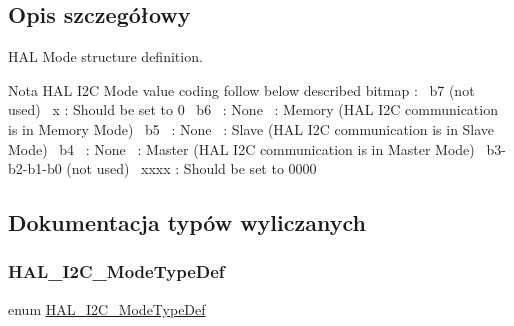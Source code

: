 \subsection{Opis szczegółowy}
H\+AL Mode structure definition. 

\begin{DoxyNote}{Nota}
H\+AL I2C Mode value coding follow below described bitmap \+:~\newline
 b7 (not used)~\newline
 x \+: Should be set to 0~\newline
 b6~ \+: None~ \+: Memory (H\+AL I2C communication is in Memory Mode)~\newline
 b5~ \+: None~ \+: Slave (H\+AL I2C communication is in Slave Mode)~\newline
 b4~ \+: None~ \+: Master (H\+AL I2C communication is in Master Mode)~\newline
 b3-\/b2-\/b1-\/b0 (not used)~\newline
 xxxx \+: Should be set to 0000 
\end{DoxyNote}


\subsection{Dokumentacja typów wyliczanych}
\mbox{\label{group___h_a_l__mode__structure__definition_gabcbb7b844f2ffd63c4e530c117882062}} 
\subsubsection{\texorpdfstring{H\+A\+L\+\_\+\+I2\+C\+\_\+\+Mode\+Type\+Def}{HAL\_I2C\_ModeTypeDef}}
{\footnotesize\ttfamily enum \hyperlink{group___h_a_l__mode__structure__definition_gabcbb7b844f2ffd63c4e530c117882062}{H\+A\+L\+\_\+\+I2\+C\+\_\+\+Mode\+Type\+Def}}

